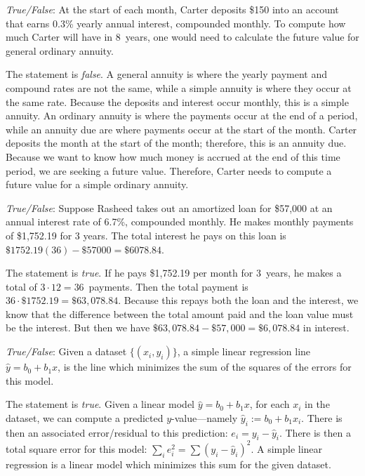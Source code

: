 \documentclass[11pt,letterpaper]{article}
\begin{document}
\quizsol \textit{True/False}: At the start of each month, Carter deposits \$150 into an account that earns 0.3\% yearly annual interest, compounded monthly. To compute how much Carter will have in 8~years, one would need to calculate the future value for general ordinary annuity. \pspace

\sol The statement is \textit{false}. A general annuity is where the yearly payment and compound rates are not the same, while a simple annuity is where they occur at the same rate. Because the deposits and interest occur monthly, this is a simple annuity. An ordinary annuity is where the payments occur at the end of a period, while an annuity due are where payments occur at the start of the month. Carter deposits the month at the start of the month; therefore, this is an annuity due. Because we want to know how much money is accrued at the end of this time period, we are seeking a future value. Therefore, Carter needs to compute a future value for a simple ordinary annuity. 





\newpage





\quizsol \textit{True/False}: Suppose Rasheed takes out an amortized loan for \$57,000 at an annual interest rate of 6.7\%, compounded monthly. He makes monthly payments of \$1,752.19 for 3 years. The total interest he pays on this loan is $\$1752.19(36) - \$57000 = \$6078.84$. \pspace

\sol The statement is \textit{true}. If he pays \$1,752.19 per month for 3~years, he makes a total of $3 \cdot 12= 36$~payments. Then the total payment is $36 \cdot \$1752.19= \$63,078.84$. Because this repays both the loan and the interest, we know that the difference between the total amount paid and the loan value must be the interest. But then we have $\$63,078.84 - \$57,000= \$6,078.84$ in interest. \pvspace{1.5cm}




\quizsol \textit{True/False}: Given a dataset $\{ (x_i, y_i) \}$, a simple linear regression line $\widehat{y}= b_0 + b_1x$, is the line which minimizes the sum of the squares of the errors for this model. \pspace

\sol The statement is \textit{true}. Given a linear model $\widehat{y}= b_0 + b_1 x$, for each $x_i$ in the dataset, we can compute a predicted $y$-value---namely $\widehat{y}_i:= b_0 + b_1 x_i$. There is then an associated error/residual to this prediction: $e_i= y_i - \widehat{y}_i$. There is then a total square error for this model: $\displaystyle \sum_i e_i^2= \sum (y_i - \widehat{y}_i)^2$. A simple linear regression is a linear model which minimizes this sum for the given dataset. \pvspace{1.5cm}
\end{document}
